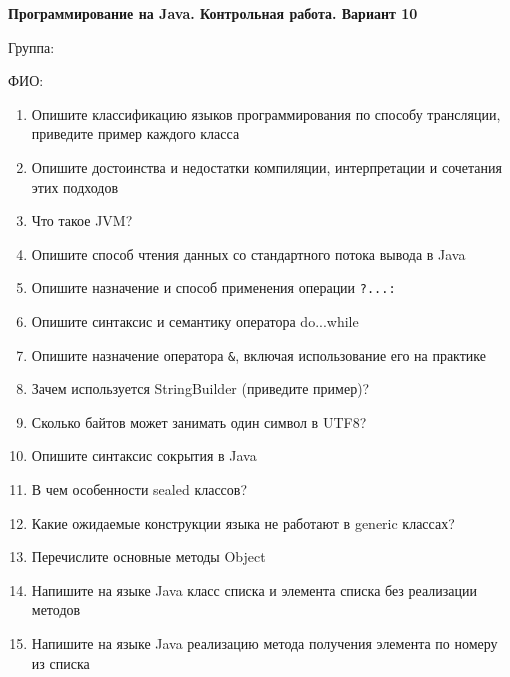 \documentclass[12pt]{article}
\begin{document}
\newpage\begin{minipage}{\textwidth}
\textbf{Программирование на Java. Контрольная работа. Вариант 10}

Группа: \underline{\hspace{3cm}}

ФИО: \underline{\hspace{10cm}}

\begin{enumerate}
\item Опишите классификацию языков программирования по способу трансляции, приведите пример каждого класса
\item Опишите достоинства и недостатки компиляции, интерпретации и сочетания этих подходов
\item Что такое JVM?
\item Опишите способ чтения данных со стандартного потока вывода в Java
\item Опишите назначение и способ применения операции \verb|?...:|
\item Опишите синтаксис и семантику оператора do...while
\item Опишите назначение оператора \verb|&|, включая использование его на практике
\item Зачем используется StringBuilder (приведите пример)?
\item Сколько байтов может занимать один символ в UTF8?
\item Опишите синтаксис сокрытия в Java
\item В чем особенности sealed классов?
\item Какие ожидаемые конструкции языка не работают в generic классах?
\item Перечислите основные методы Object
\item Напишите на языке Java класс списка и элемента списка без реализации методов
\item Напишите на языке Java реализацию метода получения элемента по номеру из списка

\end{enumerate}
\end{minipage}
\end{document}
